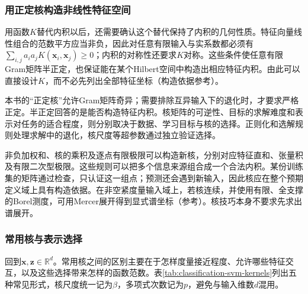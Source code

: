 \subsubsection{用正定核构造非线性特征空间}
\label{sec:classic-overview-kernel-validity}
\label{sec:classification-svm-mercer}

用函数$K$替代内积以后，还需要确认这个替代保持了内积的几何性质。特征向量线性组合的范数平方应当非负，因此对任意有限输入与实系数都必须有$\sum_{i,j}a_i a_jK(\bm x_i,\bm x_j)\geq0$；内积的对称性还要求$K$对称。这些条件使任意有限Gram矩阵半正定，也保证能在某个Hilbert空间中构造出相应特征内积。由此可以直接设计$K$，而不必先列出全部特征坐标（构造依据参考）。

本书的“正定核”允许Gram矩阵奇异；需要排除互异输入下的退化时，才要求严格正定。半正定回答的是能否构造特征内积。核矩阵的可逆性、目标的求解难度和表示对任务的适合程度，则分别取决于数据、学习目标与核的选择。正则化和选解规则处理求解中的退化，核尺度等超参数通过独立验证选择。

非负加权和、核的乘积及逐点有限极限可以构造新核，分别对应特征直和、张量积及有限二次型极限。这些规则可以把多个信息来源组合成一个合法内积。某份训练集的矩阵通过检查，只认证这一组点；预测还会遇到新输入，因此核应在整个预期定义域上具有构造依据。在非空紧度量输入域上，若核连续，并使用有限、全支撑的Borel测度，可用Mercer展开得到显式谱坐标（参考）。核技巧本身不要求先求出谱展开。

\subsubsection{常用核与表示选择}
\label{sec:classic-overview-common-kernels}
\label{sec:classification-svm-common-kernels}

回到$\bm{x},\bm{z}\in\mathbb{R}^d$。常用核之间的区别主要在于怎样度量接近程度、允许哪些特征交互，以及这些选择带来怎样的函数范数。表\ref{tab:classification-svm-kernels}列出五种常见形式，核尺度统一记为$\beta$，多项式次数记为$p$，避免与输入维数$d$混用。

